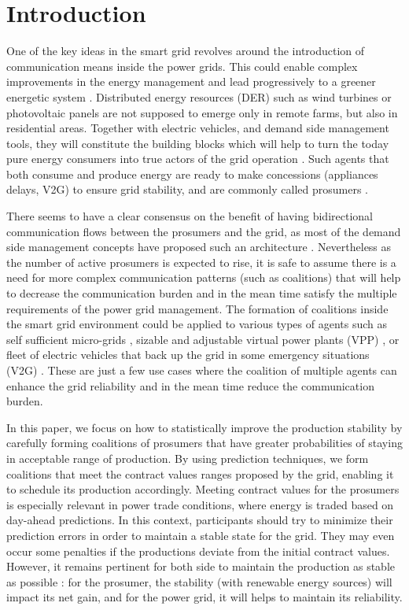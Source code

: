 \documentclass[conference]{IEEEtran}
\begin{document}
\section{Introduction}
\label{sec:introduction}

One of the key ideas in the smart grid revolves around the introduction of communication means inside the power grids. This could enable complex improvements in the energy management and lead progressively to a greener energetic system \cite{Ramchurn} \cite{WuHamedHuangBook2011}. Distributed energy resources (DER) such as wind turbines or photovoltaic panels are not supposed to emerge only in remote farms, but also in residential areas. Together with electric vehicles, and demand side management tools, they will constitute the building blocks which will help to turn the today pure energy consumers into true actors of the grid operation \cite{Ramchurn}. Such agents that both consume and produce energy are ready to make concessions (appliances delays, V2G) to ensure grid stability, and are commonly called prosumers \cite{Rathnayaka2012} \cite{Ramchurn}.

There seems to have a clear consensus on the benefit of having bidirectional communication flows between the prosumers and the grid, as most of the demand side management concepts have proposed such an architecture \cite{WuHamedHuangBook2011}. Nevertheless as the number of active prosumers is expected to rise, it is safe to assume there is a need for more complex communication patterns (such as coalitions) that will help to decrease the communication burden and in the mean time satisfy the multiple requirements of the power grid management. The formation of coalitions inside the smart grid environment could be applied to various types of agents such as self sufficient micro-grids \cite{Pahwa}, sizable and adjustable virtual power plants (VPP) \cite{Braun, Ramchurn}, or fleet of electric vehicles that back up the grid in some emergency situations (V2G) \cite{Ramchurn}. These are just a few use cases where the coalition of multiple agents can enhance the grid reliability and in the mean time reduce the communication burden.

In this paper, we focus on how to statistically improve the production stability by carefully forming coalitions of prosumers that have greater probabilities of staying in acceptable range of production. By using prediction techniques, we form coalitions that meet the contract values ranges proposed by the grid, enabling it to schedule its production accordingly. Meeting contract values for the prosumers is especially relevant in power trade conditions, where energy is traded based on day-ahead predictions. In this context, participants should try to minimize their prediction errors in order to maintain a stable state for the grid. They may even occur some penalties if the productions deviate from the initial contract values. However, it remains pertinent for both side to maintain the production as stable as possible : for the prosumer, the stability (with renewable energy sources) will impact its net gain, and for the power grid, it will helps to maintain its reliability.
\end{document}
